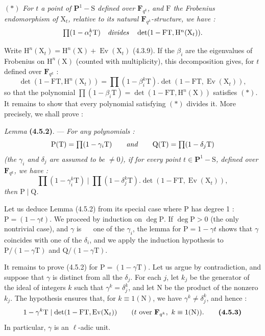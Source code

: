 \documentclass[11pt,leqno]{article}
\newcommand{\Page}[1]{\ifvmode\noindent\else\unskip\ \fi{\footnotesize\textcolor{gray}{[p.\,#1]}}\ \ignorespaces}
\begin{document}
\((*)\) \textit{For \(t\) a point of \(\mathbf{P}^1-\mathrm{S}\) defined over \(\mathbf{F}_{q^k}\), and \(\mathrm{F}\) the Frobenius endomorphism of \(\mathrm{X}_t\), relative to its natural \(\mathbf{F}_{q^k}\)-structure, we have :}
\[
\textstyle
\prod(1-\alpha_i^k\mathrm{T})
\quad\text{\textit{divides}}\quad
\det(1-\mathrm{F}\mathrm{T},\mathrm{H}^n(\mathrm{X}_t)).
\]

Write \(\mathrm{H}^n(\mathrm{X}_t)=\mathrm{H}^n(\mathrm{X})+\operatorname{Ev}(\mathrm{X}_t)\) (4.3.9). If the \(\beta_i\) are the eigenvalues of Frobenius on \(\mathrm{H}^n(\mathrm{X})\) (counted with multiplicity), this decomposition gives, for \(t\) defined over \(\mathbf{F}_{q^k}\) :
\[
\textstyle
\det(1-\mathrm{F}\mathrm{T},\mathrm{H}^n(\mathrm{X}_t))
=\prod(1-\beta_i^k\mathrm{T}).\det(1-\mathrm{F}\mathrm{T},\operatorname{Ev}(\mathrm{X}_t)),
\]
so that the polynomial \(\prod(1-\beta_i\mathrm{T})=\det(1-\mathrm{F}\mathrm{T},\mathrm{H}^n(\mathrm{X}))\) satisfies \((*)\). It remains to show that every polynomial satisfying \((*)\) divides it. More precisely, we shall prove :

\textit{Lemma} \textbf{(4.5.2)}. — \textit{For any polynomials :}
\[
\textstyle
\mathrm{P}(\mathrm{T})=\prod(1-\gamma_i\mathrm{T})
\qquad\text{\textit{and}}\qquad
\mathrm{Q}(\mathrm{T})=\prod(1-\delta_j\mathrm{T})
\]
\textit{(the \(\gamma_i\) and \(\delta_j\) are assumed to be \(\neq0\)), if for every point \(t\in\mathbf{P}^1-\mathrm{S}\), defined over \(\mathbf{F}_{q^k}\), we have :}
\[
\textstyle
\prod(1-\gamma_i^k\mathrm{T})
\mid
\prod(1-\delta_j^k\mathrm{T}).\det(1-\mathrm{F}\mathrm{T},\operatorname{Ev}(\mathrm{X}_t)),
\]
\textit{then \(\mathrm{P}\mid\mathrm{Q}\).}

Let us deduce Lemma (4.5.2) from its special case where \(\mathrm{P}\) has degree 1 : \(\mathrm{P}=(1-\gamma t)\). We proceed by induction on \(\deg\mathrm{P}\). If \(\deg\mathrm{P}>0\) (the only nontrivial case), and \(\gamma\) is
\Page{232}
one of the \(\gamma_i\), the lemma for \(\mathrm{P}=1-\gamma t\) shows that \(\gamma\) coincides with one of the \(\delta_i\), and we apply the induction hypothesis to \(\mathrm{P}/(1-\gamma\mathrm{T})\) and \(\mathrm{Q}/(1-\gamma\mathrm{T})\).

It remains to prove (4.5.2) for \(\mathrm{P}=(1-\gamma\mathrm{T})\). Let us argue by contradiction, and suppose that \(\gamma\) is distinct from all the \(\delta_j\). For each \(j\), let \(k_j\) be the generator of the ideal of integers \(k\) such that \(\gamma^k=\delta_j^k\), and let \(\mathrm{N}\) be the product of the nonzero \(k_j\). The hypothesis ensures that, for \(k\equiv1(\mathrm{N})\), we have \(\gamma^k\neq\delta_j^k\), and hence :
\[
1-\gamma^k\mathrm{T}
\mid\det(1-\mathrm{F}\mathrm{T},\operatorname{Ev}(\mathrm{X}_t))
\qquad
(t\text{ over }\mathbf{F}_{q^k},\ k\equiv1(\mathrm{N})).
\tag*{\textbf{(4.5.3)}}
\]
In particular, \(\gamma\) is an \(\ell\)-adic unit.
\end{document}
